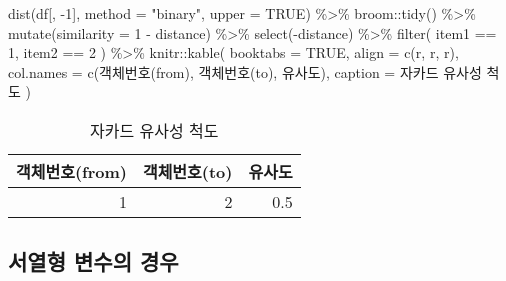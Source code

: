 \documentclass[
]{book}
\newenvironment{Shaded}{\begin{snugshade}}{\end{snugshade}}
\newcommand{\AttributeTok}[1]{\textcolor[rgb]{0.77,0.63,0.00}{#1}}
\newcommand{\ConstantTok}[1]{\textcolor[rgb]{0.00,0.00,0.00}{#1}}
\newcommand{\DecValTok}[1]{\textcolor[rgb]{0.00,0.00,0.81}{#1}}
\newcommand{\FunctionTok}[1]{\textcolor[rgb]{0.00,0.00,0.00}{#1}}
\newcommand{\NormalTok}[1]{#1}
\newcommand{\SpecialCharTok}[1]{\textcolor[rgb]{0.00,0.00,0.00}{#1}}
\newcommand{\StringTok}[1]{\textcolor[rgb]{0.31,0.60,0.02}{#1}}
\begin{document}
\begin{Shaded}
\begin{Highlighting}[]
\FunctionTok{dist}\NormalTok{(df[, }\SpecialCharTok{{-}}\DecValTok{1}\NormalTok{], }\AttributeTok{method =} \StringTok{"binary"}\NormalTok{, }\AttributeTok{upper =} \ConstantTok{TRUE}\NormalTok{) }\SpecialCharTok{\%\textgreater{}\%}
\NormalTok{  broom}\SpecialCharTok{::}\FunctionTok{tidy}\NormalTok{() }\SpecialCharTok{\%\textgreater{}\%}
  \FunctionTok{mutate}\NormalTok{(}\AttributeTok{similarity =} \DecValTok{1} \SpecialCharTok{{-}}\NormalTok{ distance) }\SpecialCharTok{\%\textgreater{}\%}
  \FunctionTok{select}\NormalTok{(}\SpecialCharTok{{-}}\NormalTok{distance) }\SpecialCharTok{\%\textgreater{}\%}
  \FunctionTok{filter}\NormalTok{(}
\NormalTok{    item1 }\SpecialCharTok{==} \DecValTok{1}\NormalTok{,}
\NormalTok{    item2 }\SpecialCharTok{==} \DecValTok{2}
\NormalTok{  ) }\SpecialCharTok{\%\textgreater{}\%}
\NormalTok{  knitr}\SpecialCharTok{::}\FunctionTok{kable}\NormalTok{(}
    \AttributeTok{booktabs =} \ConstantTok{TRUE}\NormalTok{,}
    \AttributeTok{align =} \FunctionTok{c}\NormalTok{(}\StringTok{\textquotesingle{}r\textquotesingle{}}\NormalTok{, }\StringTok{\textquotesingle{}r\textquotesingle{}}\NormalTok{, }\StringTok{\textquotesingle{}r\textquotesingle{}}\NormalTok{),}
    \AttributeTok{col.names =} \FunctionTok{c}\NormalTok{(}\StringTok{\textquotesingle{}객체번호(from)\textquotesingle{}}\NormalTok{, }\StringTok{\textquotesingle{}객체번호(to)\textquotesingle{}}\NormalTok{, }\StringTok{\textquotesingle{}유사도\textquotesingle{}}\NormalTok{),}
    \AttributeTok{caption =} \StringTok{\textquotesingle{}자카드 유사성 척도\textquotesingle{}}
\NormalTok{  )}
\end{Highlighting}
\end{Shaded}

\begin{table}

\caption{\label{tab:binary-jaccard}자카드 유사성 척도}
\centering
\begin{tabular}[t]{rrr}
\toprule
객체번호(from) & 객체번호(to) & 유사도\\
\midrule
1 & 2 & 0.5\\
\bottomrule
\end{tabular}
\end{table}

\hypertarget{ordinal-similarity-metric}{%
\subsection{서열형 변수의 경우}\label{ordinal-similarity-metric}}
\end{document}
